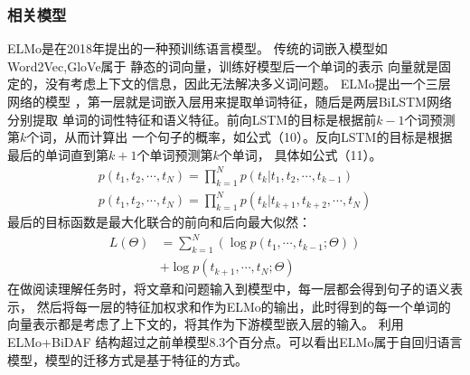 \subsubsection{相关模型}
ELMo是在2018年提出的一种预训练语言模型。
传统的词嵌入模型如Word2Vec,GloVe属于
静态的词向量，训练好模型后一个单词的表示
向量就是固定的，没有考虑上下文的信息，因此无法解决多义词问题。
ELMo提出一个三层网络的模型
，第一层就是词嵌入层用来提取单词特征，随后是两层BiLSTM网络分别提取
单词的词性特征和语义特征。前向LSTM的目标是根据前$k-1$个词预测第$k$个词，从而计算出
一个句子的概率，如公式（10）。反向LSTM的目标是根据最后的单词直到第$k+1$个单词预测第$k$个单词，
具体如公式（11）。
\begin{gather}
    p(t_1,t_2,\cdots,t_N)=\prod_{k=1}^{N}p(t_k|t_1,t_2,\cdots,t_{k-1})\\
    p(t_1,t_2,\cdots,t_N)=\prod_{k=1}^{N}p(t_k|t_{k+1},t_{k+2},\cdots,t_{N})
\end{gather}
最后的目标函数是最大化联合的前向和后向最大似然：
\begin{equation}
    \begin{split}
    L(\Theta)&=\sum_{k=1}^{N}(\log p(t_1,\cdots,t_{k-1};\Theta)) \\
        &+\log p(t_{k+1},\cdots,t_N;\Theta)
    \end{split}
\end{equation}
在做阅读理解任务时，将文章和问题输入到模型中，每一层都会得到句子的语义表示，
然后将每一层的特征加权求和作为ELMo的输出，此时得到的每一个单词的
向量表示都是考虑了上下文的，将其作为下游模型嵌入层的输入。
利用ELMo+BiDAF
结构超过之前单模型8.3个百分点。可以看出ELMo属于自回归语言模型，模型的迁移方式是基于特征的方式。




